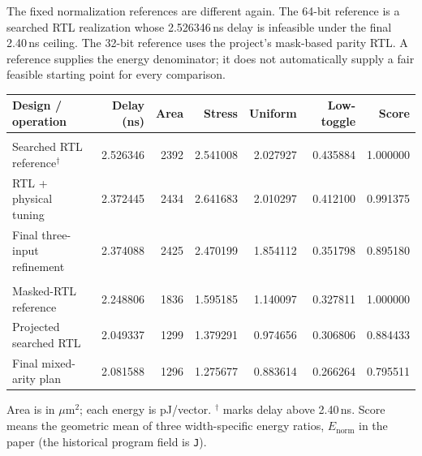 \documentclass[10pt]{article}
\begin{document}
The fixed normalization references are different again. The 64-bit reference is a searched RTL realization whose 2.526346\,ns delay is infeasible under the final 2.40\,ns ceiling. The 32-bit reference uses the project's mask-based parity RTL. A reference supplies the energy denominator; it does not automatically supply a fair feasible starting point for every comparison.
\begin{center}\fontsize{8.4}{10.1}\selectfont\setlength{\tabcolsep}{3.6pt}
\begin{tabular}{@{}>{\raggedright\arraybackslash}p{5.3cm}rrrrrr@{}}\toprule
Design / operation & Delay (ns) & Area & Stress & Uniform & Low-toggle & Score\\\midrule
\multicolumn{7}{@{}l}{\textbf{64-bit decoder}}\\
Searched RTL reference$^{\dagger}$ & 2.526346 & 2392 & 2.541008 & 2.027927 & 0.435884 & 1.000000\\
RTL + physical tuning & 2.372445 & 2434 & 2.641683 & 2.010297 & 0.412100 & 0.991375\\
Final three-input refinement & 2.374088 & 2425 & 2.470199 & 1.854112 & 0.351798 & 0.895180\\
\midrule
\multicolumn{7}{@{}l}{\textbf{32-bit decoder}}\\
Masked-RTL reference & 2.248806 & 1836 & 1.595185 & 1.140097 & 0.327811 & 1.000000\\
Projected searched RTL & 2.049337 & 1299 & 1.379291 & 0.974656 & 0.306806 & 0.884433\\
Final mixed-arity plan & 2.081588 & 1296 & 1.275677 & 0.883614 & 0.266264 & 0.795511\\
\bottomrule\end{tabular}\end{center}
Area is in $\mu$m$^2$; each energy is pJ/vector. $^{\dagger}$ marks delay above 2.40\,ns. Score means the geometric mean of three width-specific energy ratios, $E_{\mathrm{norm}}$ in the paper (the historical program field is \texttt{J}).
\end{document}
